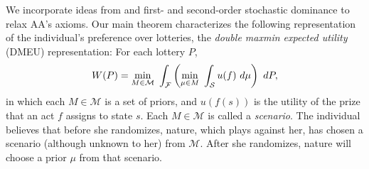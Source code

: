 \documentclass[12pt, notitlepage]{article}
\begin{document}
We incorporate ideas from \cite{GilboaSchmeidler89} and first- and
second-order stochastic dominance to relax AA's axioms. Our main theorem
characterizes the following representation of the individual's preference
over lotteries, the \textit{double maxmin expected utility} (DMEU)
representation: For each lottery $P$,%
\begin{equation*}
W(P)=\min_{M\in \mathcal{M}}~\int_{\mathcal{F}}\left( \underset{\mu \in M}{%
\min }~\int_{\mathcal{S}}u(f)~d\mu \right) ~dP,
\end{equation*}%
in which each $M\in \mathcal{M}$ is a set of priors, and $u(f(s))$ is the
utility of the prize that an act $f$ assigns to state $s$. Each $M\in 
\mathcal{M}$ is called a \textit{scenario}. The individual believes that
before she randomizes, nature, which plays against her, has chosen a
scenario (although unknown to her) from $\mathcal{M}$. After she randomizes,
nature will choose a prior $\mu $ from that scenario.

\end{document}

